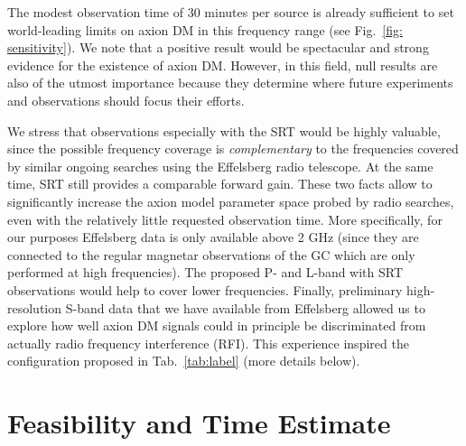 \documentclass[a4paper, 11pt]{article}
\newcommand{\cw}[1]{\textbf{\color{red} CW: #1}}
\begin{document}
The modest observation time of 30 minutes per source is already sufficient to set world-leading limits on axion DM in this frequency range (see Fig.~\ref{fig: sensitivity}). We note that a positive result would be spectacular and strong evidence for the existence of axion DM.  However, in this field, null results are also of the utmost importance because they determine where future experiments and observations should focus their efforts. 



\medskip

We stress that observations especially with the SRT would be highly valuable, since the possible frequency coverage is \textit{complementary} to the frequencies covered by similar ongoing searches using the Effelsberg radio telescope.  At the same time, SRT still provides a comparable forward gain.  These two facts allow to significantly increase the axion model parameter space probed by radio searches, even with the relatively little requested observation time.  More specifically, for our purposes Effelsberg data is only available above 2 GHz (since they are connected to the regular magnetar observations of the GC which are only performed at high frequencies).  The proposed P- and L-band with SRT observations would help to cover lower frequencies.  %
Finally, preliminary high-resolution S-band data that we have available from Effelsberg allowed us to explore how well axion DM signals could in principle be discriminated from actually radio frequency interference (RFI).  This experience inspired the configuration proposed in Tab.~\ref{tab:label} (more details below).


\section*{Feasibility and Time Estimate}
\end{document}
